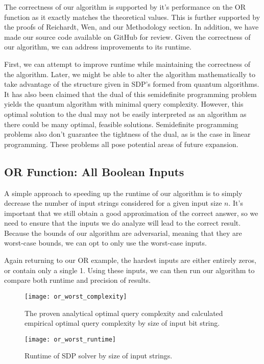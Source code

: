 The correctness of our algorithm is supported by it's performance on the OR function as it exactly matches the theoretical values. This is further supported by the proofs of Reichardt, Wen, and our Methodology section. In addition, we have made our source code available on GitHub for review. Given the correctness of our algorithm, we can address improvements to its runtime.

First, we can attempt to improve runtime while
maintaining the correctness of the algorithm. Later,
we might be able to alter the algorithm
mathematically to take advantage of the structure
given in SDP's formed from quantum algorithms. 
It has also been claimed that the dual of this semidefinite
programming problem yields the quantum algorithm with minimal query complexity.
However, this optimal solution to the dual may not be easily 
interpreted as an algorithm as there could be many optimal, feasible solutions. 
Semidefinite programming problems also don't guarantee the tightness of the dual,
as is the case in linear programming. 
These problems all pose potential areas of future expansion.

\subsection{OR Function: All Boolean Inputs}

A simple approach to speeding up the runtime of our
algorithm is to simply decrease the number of input
strings considered for a given input size $n$. It's
important that we still obtain a good approximation
of the correct answer, so we need to ensure that the
inputs we do analyze will lead to the correct result.
Because the bounds of our algorithm are adversarial,
meaning that they are worst-case bounds, we can opt
to only use the worst-case inputs.

Again returning to our OR example, the hardest inputs are
either entirely zeros, or contain only a single 1. 
Using these inputs, we can then run our algorithm to 
compare both runtime and precision of results.

\begin{figure}[ht]
\centering
\texttt{[image: or\_worst\_complexity]}
\caption{The proven analytical optimal query complexity
and calculated empirical optimal query complexity by 
size of input bit string.}
\label{fig:or_worst_complexity}
\end{figure}

\begin{figure}[ht]
\centering
\texttt{[image: or\_worst\_runtime]}
\caption{Runtime of SDP solver by size of input strings.}
\label{fig:or_worst_runtime}
\end{figure}

